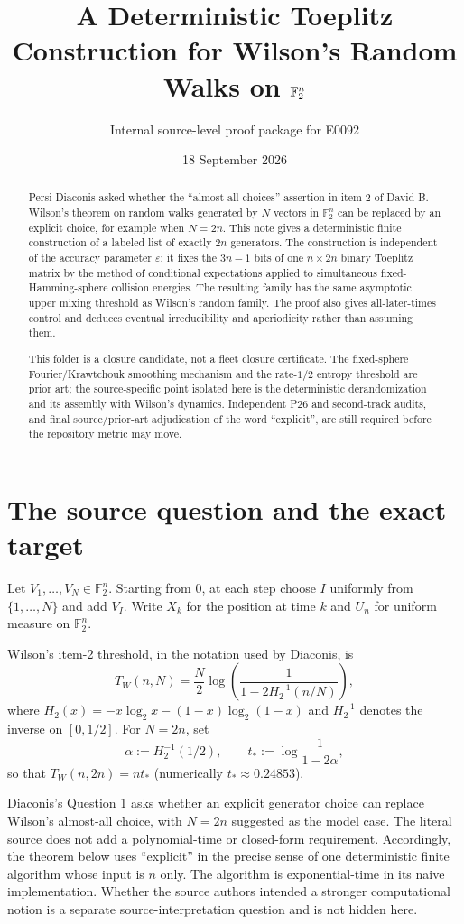 \documentclass[11pt]{article}
\title{A Deterministic Toeplitz Construction for Wilson's Random Walks on $\F_2^n$}
\author{Internal source-level proof package for E0092}
\date{18 September 2026}
\newcommand{\F}{\mathbb F}
\newcommand{\1}{\mathbf 1}
\begin{document}
\maketitle

\begin{abstract}
Persi Diaconis asked whether the ``almost all choices'' assertion in item 2 of David B. Wilson's theorem on random walks generated by $N$ vectors in $\F_2^n$ can be replaced by an explicit choice, for example when $N=2n$.  This note gives a deterministic finite construction of a labeled list of exactly $2n$ generators.  The construction is independent of the accuracy parameter $\varepsilon$: it fixes the $3n-1$ bits of one $n\times 2n$ binary Toeplitz matrix by the method of conditional expectations applied to simultaneous fixed-Hamming-sphere collision energies.  The resulting family has the same asymptotic upper mixing threshold as Wilson's random family.  The proof also gives all-later-times control and deduces eventual irreducibility and aperiodicity rather than assuming them.

This folder is a closure candidate, not a fleet closure certificate.  The fixed-sphere Fourier/Krawtchouk smoothing mechanism and the rate-$1/2$ entropy threshold are prior art; the source-specific point isolated here is the deterministic derandomization and its assembly with Wilson's dynamics.  Independent P26 and second-track audits, and final source/prior-art adjudication of the word ``explicit'', are still required before the repository metric may move.
\end{abstract}

\section{The source question and the exact target}

Let $V_1,\dots,V_N\in\F_2^n$.  Starting from $0$, at each step choose $I$ uniformly from $\{1,\dots,N\}$ and add $V_I$.  Write $X_k$ for the position at time $k$ and $U_n$ for uniform measure on $\F_2^n$.

Wilson's item-2 threshold, in the notation used by Diaconis, is
\[
 T_W(n,N)=\frac N2\log\!\left(\frac{1}{1-2H_2^{-1}(n/N)}\right),
\]
where $H_2(x)=-x\log_2x-(1-x)\log_2(1-x)$ and $H_2^{-1}$ denotes the inverse on $[0,1/2]$.  For $N=2n$, set
\[
 \alpha:=H_2^{-1}(1/2),\qquad
 t_*:=\log\frac{1}{1-2\alpha},
\]
so that $T_W(n,2n)=nt_*$ (numerically $t_*\approx0.24853$).

Diaconis's Question 1 asks whether an explicit generator choice can replace Wilson's almost-all choice, with $N=2n$ suggested as the model case.  The literal source does not add a polynomial-time or closed-form requirement.  Accordingly, the theorem below uses ``explicit'' in the precise sense of one deterministic finite algorithm whose input is $n$ only.  The algorithm is exponential-time in its naive implementation.  Whether the source authors intended a stronger computational notion is a separate source-interpretation question and is not hidden here.
\end{document}
